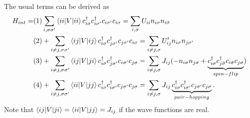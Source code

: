 \documentclass[12pt,a4paper]{scrartcl}
\numberwithin{equation}{section}
\begin{document}
The usual terms can be derived as
\begin{align}
 H_{int}
 = &(1) \sum_{i,\sigma\sigma'} \braket{ii|V|ii} c^{\dagger}_{i\sigma} c^{\dagger}_{i\sigma'} c_{i\sigma'} c_{i\sigma}
  = \sum_{i,\sigma} U_{ii} n_{i\sigma} n_{i\bar{\sigma}} \\
%  
&(2) + \sum_{i\neq j,\sigma\sigma'} \braket{ij|V|ij} c^{\dagger}_{i\sigma} c^{\dagger}_{j\sigma'} c_{j\sigma'} c_{i\sigma}
  = \sum_{i\neq j,\sigma} U'_{ij} n_{i\sigma} n_{j\sigma'} \\
%  
&(3) + \sum_{i\neq j,\sigma\sigma'} \braket{ij|V|ji} c^{\dagger}_{i\sigma} c^{\dagger}_{j\sigma'} c_{i\sigma'} c_{j\sigma}
  = \sum_{i\neq j,\sigma} J_{ij} (-n_{i\sigma} n_{j\sigma}  + \underbrace{ c^{\dagger}_{i\sigma} c^{\dagger}_{j\bar{\sigma}} c_{i\bar{\sigma}} c_{j\sigma} }_{spin-flip} )  \\
%  
&(4) + \sum_{i\neq j,\sigma\sigma'} \braket{ii|V|jj} c^{\dagger}_{i\sigma} c^{\dagger}_{i\sigma'} c_{j\sigma'} c_{j\sigma}
  = \sum_{i\neq j,\sigma} J_{ij}   \underbrace{ c^{\dagger}_{i\sigma} c^{\dagger}_{i\sigma'} c_{j\sigma'} c_{j\sigma} }_{pair-hopping}. 
\end{align}
Note that $\braket{ij|V|ji} = \braket{ii|V|jj} = J_{ij}$ if the wave functions are real.
\end{document}
